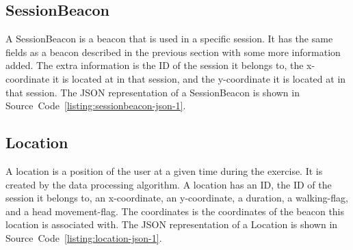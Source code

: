\documentclass[../Main/thesis.tex]{subfiles}
\begin{document}

\subsection{SessionBeacon}
A SessionBeacon is a beacon that is used in a specific session.
It has the same fields as a beacon described in the previous section with some more information added.
The extra information is the ID of the session it belongs to, the x-coordinate it is located at in that session, and the y-coordinate it is located at in that session.
The JSON representation of a SessionBeacon is shown in Source~Code~\ref{listing:sessionbeacon-json-1}.


\subsection{Location}
A location is a position of the user at a given time during the exercise.
It is created by the data processing algorithm.
A location has an ID, the ID of the session it belongs to, an x-coordinate, an y-coordinate, a duration, a walking-flag, and a head movement-flag.
The coordinates is the coordinates of the beacon this location is associated with.
The JSON representation of a Location is shown in Source~Code~\ref{listing:location-json-1}.

\end{document}
